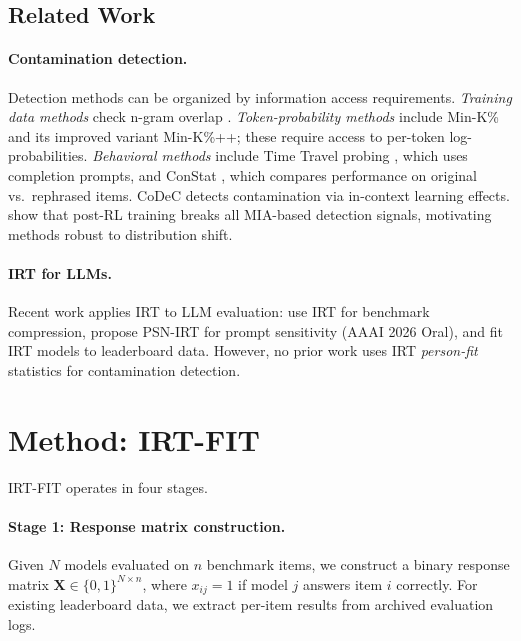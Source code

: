 \documentclass[11pt,a4paper]{article}
\begin{document}
\subsection{Related Work}

\paragraph{Contamination detection.}
Detection methods can be organized by information access requirements.
\emph{Training data methods} check n-gram overlap \citep{brown2020language,dodge2021documenting}.
\emph{Token-probability methods} include Min-K\% \citep{shi2024detecting} and its improved variant Min-K\%++; these require access to per-token log-probabilities.
\emph{Behavioral methods} include Time Travel probing \citep{golchin2024time}, which uses completion prompts, and ConStat \citep{dekoninck2024constat}, which compares performance on original vs.\ rephrased items.
CoDeC \citep{zhang2026codec} detects contamination via in-context learning effects.
\citet{wang2025contamination} show that post-RL training breaks all MIA-based detection signals, motivating methods robust to distribution shift.

\paragraph{IRT for LLMs.}
Recent work applies IRT to LLM evaluation: \citet{polo2024tinybenchmarks} use IRT for benchmark compression, \citet{gu2024psn} propose PSN-IRT for prompt sensitivity (AAAI 2026 Oral), and \citet{wang2024large} fit IRT models to leaderboard data.
However, no prior work uses IRT \emph{person-fit} statistics for contamination detection.

\section{Method: IRT-FIT}

\textsc{IRT-FIT} operates in four stages.

\paragraph{Stage 1: Response matrix construction.}
Given $N$ models evaluated on $n$ benchmark items, we construct a binary response matrix $\mathbf{X} \in \{0,1\}^{N \times n}$, where $x_{ij} = 1$ if model $j$ answers item $i$ correctly.
For existing leaderboard data, we extract per-item results from archived evaluation logs.
\end{document}

